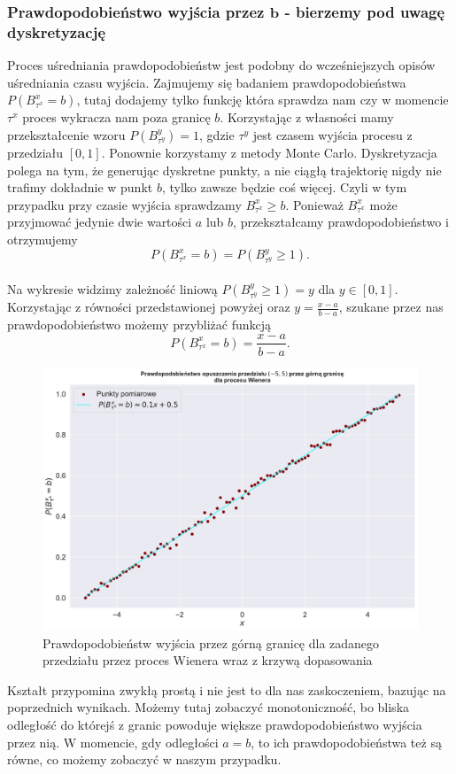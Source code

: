 \documentclass[12pt]{mwart}
\begin{document}
	
	\subsubsection{Prawdopodobieństwo wyjścia przez $\bm{b}$ - bierzemy pod uwagę dyskretyzację}
\noindent	Proces uśredniania prawdopodobieństw jest podobny do wcześniejszych opisów uśredniania czasu wyjścia. Zajmujemy się badaniem prawdopodobieństwa $P(B_{\tau^x}^x = b)$, tutaj dodajemy tylko funkcję która sprawdza nam czy w momencie $\tau^x$ proces wykracza nam poza granicę $b$.
Korzystając z własności mamy przekształcenie wzoru $P(B_{\tau^y}^y)=1$, gdzie $\tau^y$ jest czasem wyjścia procesu z przedziału $[0,1]$. Ponownie korzystamy z metody Monte Carlo.
Dyskretyzacja polega na tym, że generując dyskretne punkty, a nie ciągłą trajektorię nigdy nie trafimy dokładnie w punkt $b$, tylko zawsze będzie coś więcej. Czyli w tym przypadku przy czasie wyjścia sprawdzamy $B_{\tau^x}^x \geq b$.
Ponieważ $B_{\tau^x}^x$ może przyjmować jedynie dwie wartości $a$ lub $b$, przekształcamy prawdopodobieństwo i otrzymujemy
$$ P(B_{\tau^x}^x = b) = P(B_{\tau^y}^y \geq 1).$$\\
Na wykresie widzimy zależność liniową $P(B_{\tau^y}^y \geq 1)=y$ dla $y \in [0,1]$. Korzystając z równości przedstawionej powyżej oraz $y = \frac{x-a}{b-a}$, szukane przez nas prawdopodobieństwo możemy przybliżać funkcją
$$P(B_{\tau^x}^x = b) = \frac{x-a}{b-a}.$$

	
	
	
	\begin{figure}[H]
		\begin{center}
			
			\includegraphics[scale=0.4]{2.pdf}
			\caption{Prawdopodobieństw wyjścia przez górną granicę dla zadanego przedziału przez proces Wienera wraz z krzywą dopasowania}
		\end{center}
	\end{figure}
\noindent Kształt przypomina zwykłą prostą i nie jest to dla nas zaskoczeniem, bazując na poprzednich wynikach. Możemy tutaj zobaczyć monotoniczność, bo bliska odległość do którejś z granic powoduje większe prawdopodobieństwo wyjścia przez nią. W momencie, gdy odległości $a = b$, to ich prawdopodobieństwa też są równe, co możemy zobaczyć w naszym przypadku.\\
\end{document}
